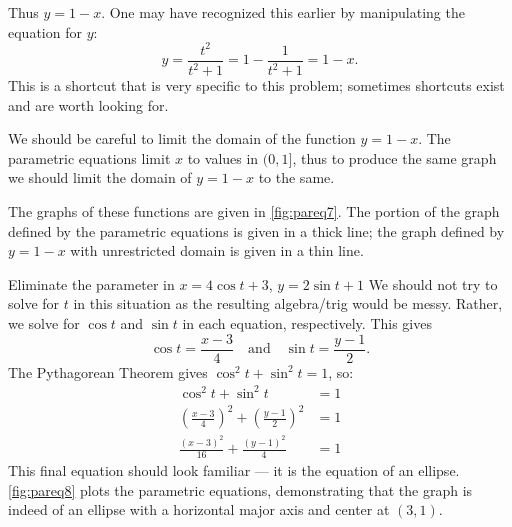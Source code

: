 \begin{example}
Thus $y=1-x$. One may have recognized this earlier by manipulating the equation for $y$:
\[y = \frac{t^2}{t^2+1} = 1-\frac{1}{t^2+1} = 1-x.\]
This is a shortcut that is very specific to this problem; sometimes shortcuts exist and are worth looking for.

We should be careful to limit the domain of the function $y=1-x$. The parametric equations limit $x$ to values in $(0,1]$, thus to produce the same graph we should limit the domain of $y=1-x$ to the same. 

The graphs of these functions are given in \autoref{fig:pareq7}. The portion of the graph defined by the parametric equations is given in a thick line; the graph defined by $y=1-x$ with unrestricted domain is given in a thin line.
\end{example}

\begin{example}\label{ex_pareq8}
Eliminate the parameter in $x=4\cos t+3$, $y= 2\sin t+1$
\solution
We should not try to solve for $t$ in this situation as the resulting algebra/trig would be messy. Rather, we solve for $\cos t$ and $\sin t$ in each equation, respectively. This gives
\[\cos t = \frac{x-3}{4} \quad \text{and}\quad \sin t=\frac{y-1}{2}.\]
The Pythagorean Theorem gives $\cos^2t+\sin^2t=1$, so:
\begin{align*}
\cos^2t+\sin^2t &=1 \\
\left(\frac{x-3}{4}\right)^2 +\left(\frac{y-1}{2}\right)^2 &=1\\
\frac{(x-3)^2}{16}+\frac{(y-1)^2}{4} &=1
\end{align*}
This final equation should look familiar --- it is the equation of an ellipse. \autoref{fig:pareq8} plots the parametric equations, demonstrating that the graph is indeed of an ellipse with a horizontal major axis and center at $(3,1)$.
\end{example}


